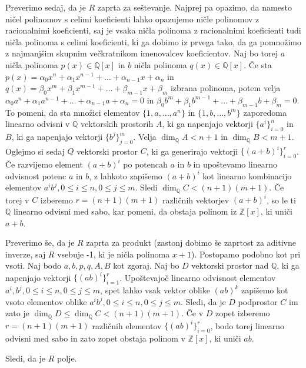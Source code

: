 \documentclass[a4paper, 12pt]{article}
\newcommand{\Z}{\mathbb{Z}}
\newcommand{\Q}{\mathbb{Q}}
\begin{document}
\begin{enumerate}
Preverimo sedaj, da je $R$ zaprta za seštevanje. Najprej pa opazimo, da namesto ničel polinomov s celimi koeficienti lahko opazujemo ničle polinomov z racionalnimi koeficienti, saj je vsaka ničla polinoma z racionalnimi koeficienti tudi ničla polinoma s celimi koeficienti, ki ga dobimo iz prvega tako, da ga pomnožimo z najmanjšim skupnim večkratnikom imenovalcev koeficientov. Naj bo torej $a$ ničla polinoma $p(x) \in \Q[x]$ in $b$ ničla polinoma $q(x)\in \Q[x]$. Če sta $p(x) = \alpha_0 x^n + \alpha_1 x^{n-1} + \dots + \alpha_{n-1}x + \alpha_n$ in $q(x) = \beta_0 x^m + \beta_1 x^{m-1} + \dots + \beta_{m-1}x + \beta_m$ izbrana polinoma, potem velja $ \alpha_0 a^n + \alpha_1 a^{n-1} + \dots + \alpha_{n-1}a + \alpha_n = 0$  in $\beta_0 b^m + \beta_1 b^{m-1} + \dots + \beta_{m-1}b + \beta_m=0$. To pomeni, da sta množici elementov $\{1,a,\dots, a^n\}$ in $\{1,b,\dots,b^m\}$ zaporedoma linearno odvisni v $\Q$ vektorskih prostorih $A$, ki ga napenjajo vektorji $\{a^i\}_{i=0}^n$ in $B$, ki ga napenjajo vektorji $\{b^j\}_{j=0}^m$. Velja $\dim_{\Q} A < n+1$ in $\dim_{ \Q} B < m+1$. Oglejmo si sedaj $Q$ vektorski prostor $C$, ki ga generirajo vektorji $\{(a+b)^i\}_{i=0}^r$. Če razvijemo element $(a+b)^i$ po potencah $a$ in $b$ in upoštevamo linearno odvisnost potenc $a$ in $b$, z lahkoto zapišemo $(a+b)^i$ kot linearno kombinacijo elementov $a^i b^j, 0\le i \le n, 0 \le j \le m$. Sledi $\dim_{\Q}C < (n+1)(m+1)$. Če torej v $C$ izberemo $r=(n+1)(m+1)$ različnih vektorjev $(a+b)^i$, so le ti $\Q$ linearno odvisni med sabo, kar pomeni, da obstaja polinom iz $\Z[x]$, ki uniči $a+b$.

Preverimo še, da je $R$ zaprta za produkt (zastonj dobimo še zaprtost za aditivne inverze, saj $R$ vsebuje -1, ki je ničla polinoma $x+1$). Postopamo podobno kot pri vsoti. Naj bodo $a,b,p,q,A,B$ kot zgoraj. Naj bo $D$ vektorski prostor nad $\Q$, ki ga napenjajo vektorji $\{(ab)^i\}_{i=1}^r$. Upoštevajoč linearno odvisnost elementov $a^i, b^j, 0\le i \le n, 0\le j \le m$, spet lahko vsak vektor oblike $(ab)^k$ zapišemo kot vsoto elementov oblike $a^ib^j, 0\le i  \le n, 0\le j \le m$. Sledi, da je $D$ podprostor $C$ im zato je $\dim_{\Q}D \le \dim_{\Q}C < (n+1)(m+1)$. Če v $D$ zopet izberemo $r=(n+1)(m+1)$ različnih elementov $\{(ab)^i\}_{i=0}^r$, bodo torej linearno odvisni med sabo in zato zopet obstaja polinom v $\Z[x]$, ki uniči $ab$.

Sledi, da je $R$ polje.


\end{enumerate}
\end{document}
